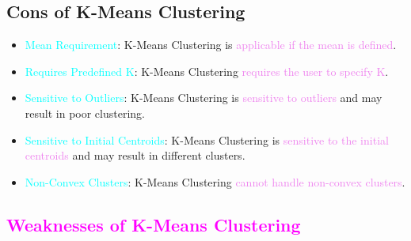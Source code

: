 \documentclass{book}
\begin{document}
\subsection{Cons of K-Means Clustering}
\begin{itemize}
    \item \textcolor{cyan}{Mean Requirement}: K-Means Clustering is \textcolor{violet}{applicable if the mean is defined}.
    \item \textcolor{cyan}{Requires Predefined K}: K-Means Clustering \textcolor{violet}{requires the user to specify K}.
    \item \textcolor{cyan}{Sensitive to Outliers}: K-Means Clustering is \textcolor{violet}{sensitive to outliers} and may result in poor clustering.
    \item \textcolor{cyan}{Sensitive to Initial Centroids}: K-Means Clustering is \textcolor{violet}{sensitive to the initial centroids} and may result in different clusters.
    \item \textcolor{cyan}{Non-Convex Clusters}: K-Means Clustering \textcolor{violet}{cannot handle non-convex clusters}.
\end{itemize}
\textcolor{magenta}{\section{\textbf{Weaknesses of K-Means Clustering}}}
\end{document}
